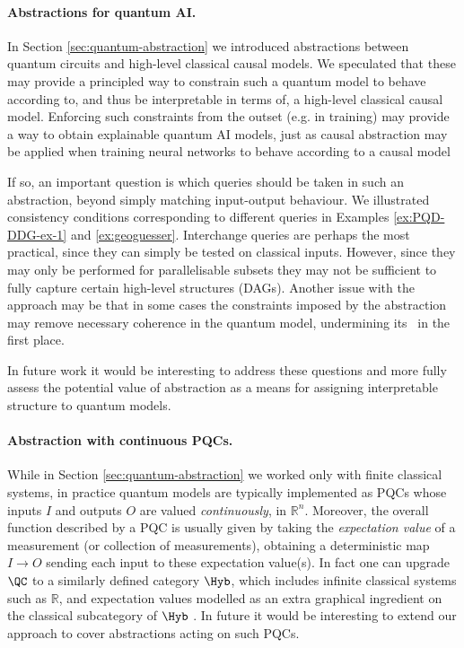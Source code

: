 \documentclass{article}
\begin{document}
{\paragraph{Abstractions for quantum AI.}
In Section \ref{sec:quantum-abstraction} we introduced abstractions between quantum circuits and high-level classical causal models. We speculated that these may provide a principled way to constrain such a quantum model to behave according to, and thus be interpretable in terms of, a high-level classical causal model. Enforcing such constraints from the outset (e.g. in training) may provide a way to obtain explainable quantum AI models, just as causal abstraction may be applied when training neural networks to behave according to a causal model 

If so, an important question is which queries should be taken in such an abstraction, beyond simply matching input-output behaviour. We illustrated consistency conditions corresponding to different queries in Examples \ref {ex:PQD-DDG-ex-1} and \ref{ex:geoguesser}. Interchange queries are perhaps the most practical, since they can simply be tested on classical inputs. However, since they may only be performed for parallelisable subsets they may not be sufficient to fully capture certain high-level structures (DAGs). Another issue with the approach may be that in some cases the constraints imposed by the abstraction may remove necessary coherence in the quantum model, undermining its \ in the first place. 

In future work it would be interesting to address these questions and more fully assess the potential value of abstraction as a means for assigning interpretable structure to quantum models. 


\color{black}
\paragraph{Abstraction with continuous PQCs.}
While in Section \ref{sec:quantum-abstraction} we worked only with finite classical systems, in practice quantum models are typically implemented as PQCs whose inputs $I$ and outputs $O$ are valued \emph{continuously}, in $\mathbb{R}^n$. Moreover, the overall function described by a PQC is usually given by taking the \emph{expectation value} of a measurement (or collection of measurements), obtaining a deterministic map $I \to O$ sending each input to these expectation value(s). In fact one can upgrade $\QC$ to a similarly defined category $\Hyb$, which includes infinite classical systems such as $\mathbb{R}$, and expectation values modelled as an extra graphical ingredient on the classical subcategory of $\Hyb$ \cite{HybPaper}. In future it would be interesting to extend our approach to cover abstractions acting on such PQCs.  


}
\end{document}
